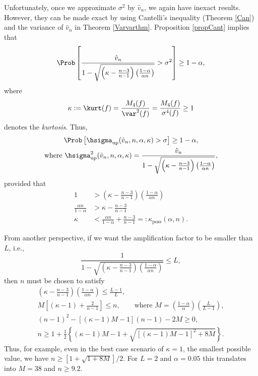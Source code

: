 \documentclass[12pt]{amsart}
\newcommand{\hv}{\hat{v}}
\begin{document}
Unfortunately, once we approximate $\sigma^2$ by $\hv_n$, we again have inexact results.  However, they can be made exact by using Cantelli's inequality (Theorem \ref{Can}) and the variance of $\hv_n$ in Theorem \ref{Varvarthm}.  Proposition \ref{propCant} implies that
\[
\Prob\left[\frac{\hv_n}{1 - \sqrt{\left ( \kappa  - \frac{n-3}{n-1}\right)\left(\frac{1-\alpha}{\alpha n}\right)}} > \sigma^2 \right] \ge 1 - \alpha,
\]
where
\begin{equation} \label{kurtdef}
\kappa:= \kurt(f) = \frac{M_4(f)}{\var^2(f)} = \frac{M_4(f)}{\sigma^4(f)} \ge 1
\end{equation}
denotes the \emph{kurtosis}.  Thus,
\begin{subequations}\label{probvarupbd}
\begin{gather}
\Prob\left[\hsigma_{\text{up}}(\hv_n,n,\alpha,\kappa)  > \sigma \right] \ge 1 - \alpha, \\
\text{where } \hsigma^2_{\text{up}}(\hv_n,n,\alpha,\kappa) = \frac{\hv_{n}}{1 - \sqrt{ \left ( \kappa  - \frac{n-3}{n-1}\right)\left(\frac{1-\alpha}{\alpha n }\right)}},
\end{gather}
\end{subequations}
provided that
\begin{align*}
1 &> \left ( \kappa  - \frac{n-3}{n-1}\right)\left(\frac{1-\alpha}{ \alpha n}\right)\\
\frac{\alpha n }{1-\alpha} & > \kappa  - \frac{n-3}{n-1} \\
\kappa & < \frac{\alpha n}{1-\alpha} + \frac{n-3}{n-1} =: \kappa_{\text{poss}} (\alpha,n).
\end{align*}

From another perspective, if we want the amplification factor to be smaller than $L$, i.e.,
\[
\frac{1}{1 - \sqrt{ \left ( \kappa  - \frac{n-3}{n-1}\right)\left(\frac{1-\alpha}{\alpha n }\right)}} \le L,
\]
then $n$ must be chosen to satisfy
\begin{gather*}
\left(\kappa  - \frac{n-3}{n-1}\right)\left(\frac{1-\alpha}{\alpha n }\right) \le \frac{L-1}{L}, \\
M\left[(\kappa-1)  + \frac{2}{n-1}\right] \le n, \qquad \text{where } M= \left(\frac{1-\alpha}{\alpha}\right)  \left(\frac{L}{L-1} \right), \\
(n-1)^2 - [(\kappa-1)M -1](n-1)  - 2 M \ge 0, \\
n \ge 1 + \frac{1}{2} \left\{ (\kappa-1)M -1 + \sqrt{\left[(\kappa-1)M -1\right]^2 + 8 M}\right\}.
\end{gather*}
Thus, for example, even in the best case scenario of $\kappa=1$, the smallest possible value, we have $n \ge [1 + \sqrt{1 + 8 M}]/2$.  For $L=2$ and $\alpha=0.05$ this translates into $M=38$ and $n \ge 9.2$.
\end{document}
